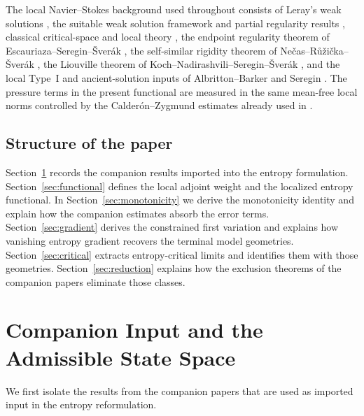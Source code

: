 \documentclass[11pt]{amsart}
\numberwithin{equation}{section}
\theoremstyle{plain}
\theoremstyle{definition}
\theoremstyle{remark}
\begin{document}
The local Navier--Stokes background used throughout consists of Leray's weak
solutions \cite{Leray1934}, the suitable weak solution framework and partial
regularity results \cite{Scheffer1976,CKN1982,Lin1998}, classical critical-space
and local theory \cite{Ladyzhenskaya1969,Temam1977,ConstantinFoias1988,Kato1984,LemarieRieusset2002},
the endpoint regularity theorem of Escauriaza--Seregin--\v Sver\'ak
\cite{ESS2003}, the self-similar rigidity theorem of
Ne\v cas--R\r u\v zi\v cka--\v Sver\'ak \cite{NRS1996}, the Liouville theorem
of Koch--Nadirashvili--Seregin--\v Sver\'ak \cite{KNSS2009}, and the local
Type~I and ancient-solution inputs of Albritton--Barker and Seregin
\cite{AlbrittonBarker2019,Seregin2012}.  The pressure terms in the present
functional are measured in the same mean-free local norms controlled by the
Calder\'on--Zygmund estimates \cite{CalderonZygmund1952,Stein1970} already used
in \cite{BallesterTypeII}.

\subsection*{Structure of the paper}

Section~\ref{sec:companion-input} records the companion results imported into
the entropy formulation.  Section~\ref{sec:functional} defines the local
adjoint weight and the localized entropy functional.  In
Section~\ref{sec:monotonicity} we derive the monotonicity identity and explain
how the companion estimates absorb the error terms.  Section~\ref{sec:gradient}
derives the constrained first variation and explains how vanishing entropy
gradient recovers the terminal model geometries.  Section~\ref{sec:critical}
extracts entropy-critical limits and identifies them with those geometries.
Section~\ref{sec:reduction} explains how the exclusion theorems of the
companion papers eliminate those classes.

\section{Companion Input and the Admissible State Space}
\label{sec:companion-input}

We first isolate the results from the companion papers that are used as
imported input in the entropy reformulation.
\end{document}
